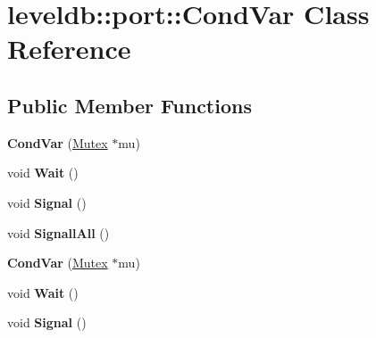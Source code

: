 \hypertarget{classleveldb_1_1port_1_1_cond_var}{}\section{leveldb\+::port\+::Cond\+Var Class Reference}
\label{classleveldb_1_1port_1_1_cond_var}
\subsection*{Public Member Functions}
\begin{DoxyCompactItemize}
\item 
\mbox{\label{classleveldb_1_1port_1_1_cond_var_abb23c74c7b58298a20d4cfd6a0c5839a}} 
{\bfseries Cond\+Var} (\mbox{\hyperlink{classleveldb_1_1port_1_1_mutex}{Mutex}} $\ast$mu)
\item 
\mbox{\label{classleveldb_1_1port_1_1_cond_var_a9e9855595a3f3a3ccf47949696065597}} 
void {\bfseries Wait} ()
\item 
\mbox{\label{classleveldb_1_1port_1_1_cond_var_ac36a2038b058b24886741c99e4a7d7d4}} 
void {\bfseries Signal} ()
\item 
\mbox{\label{classleveldb_1_1port_1_1_cond_var_a516114902b0ac99e541d74f182faa7b4}} 
void {\bfseries Signall\+All} ()
\item 
\mbox{\label{classleveldb_1_1port_1_1_cond_var_abb23c74c7b58298a20d4cfd6a0c5839a}} 
{\bfseries Cond\+Var} (\mbox{\hyperlink{classleveldb_1_1port_1_1_mutex}{Mutex}} $\ast$mu)
\item 
\mbox{\label{classleveldb_1_1port_1_1_cond_var_a9e9855595a3f3a3ccf47949696065597}} 
void {\bfseries Wait} ()
\item 
\mbox{\label{classleveldb_1_1port_1_1_cond_var_ac36a2038b058b24886741c99e4a7d7d4}} 
void {\bfseries Signal} ()
\item 
\mbox{\label{classleveldb_1_1port_1_1_cond_var_ad7725662f3c1bc542100c41081d1428a}} 

\end{DoxyCompactItemize}
